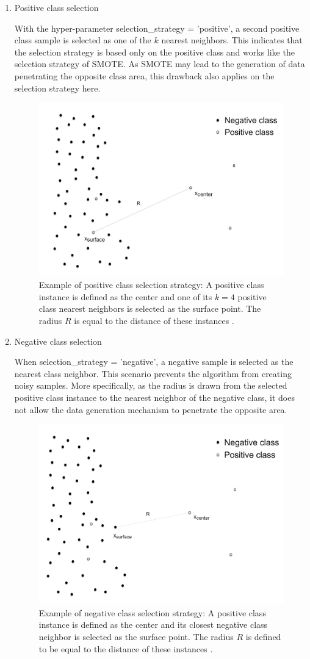 \documentclass[parskip=full]{scrartcl}
\begin{document}
\begin{enumerate}[label=($\alph*$)]

\item Positive class selection

With the hyper-parameter selection\_strategy = 'positive', a second positive 
class sample is selected as one of the \( k \) nearest neighbors. This 
indicates that the selection strategy is based only on the positive class and 
works like the selection strategy of SMOTE. As SMOTE may lead to the generation 
of data penetrating the opposite class area, this drawback also applies on the 
selection strategy here.

\begin{figure}[H]
	\centering
	\includegraphics[width=0.51\linewidth]
		{../analysis/positive_class_selection_strategy}
	\caption{Example of positive class selection strategy: A positive class 
	instance is defined as the center and one of its \( k = 4 \) positive 
	class nearest neighbors is selected as the surface point. The radius 
	\( R \) is equal to the distance of these instances 
	\cite{Douzas.2019b}.}
	\label{fig:positiveclassselectionstrategy}
\end{figure}

\item Negative class selection

When selection\_strategy = 'negative', a negative sample is selected as the 
nearest class neighbor. This scenario prevents the algorithm from creating 
noisy samples. More specifically, as the radius is drawn from the selected 
positive class instance to the nearest neighbor of the negative class, it does 
not allow the data generation mechanism to penetrate the opposite area.

\begin{figure}[H]
	\centering
	\includegraphics[width=0.5\linewidth]
		{../analysis/negative_class_selection_strategy}
	\caption{Example of negative class selection strategy: A positive class 
	instance is defined as the center and its closest negative class neighbor 
	is selected as the surface point. The radius \( R \) is defined to be 
	equal to the distance of these instances \cite{Douzas.2019b}.}
	\label{fig:negativeclassselectionstrategy}
\end{figure}


\end{enumerate}
\end{document}
